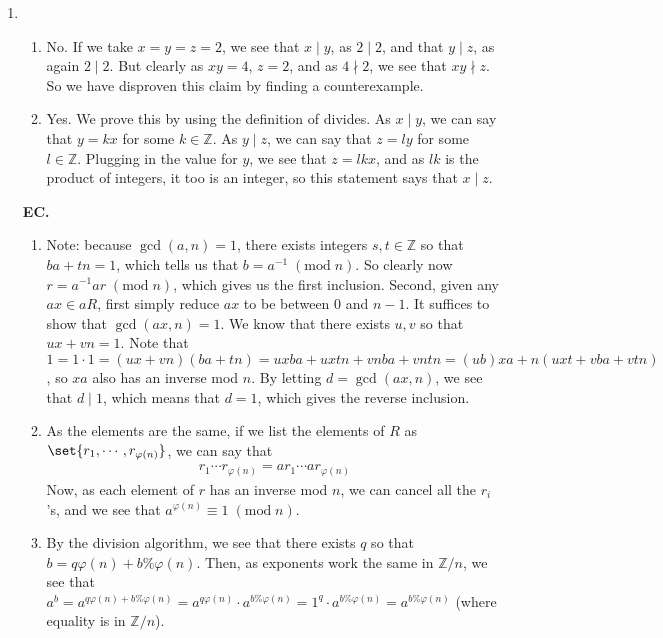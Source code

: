 \documentclass[12pt]{article}
\def\mbb#1{\mathbb{#1}}
\def\bZ{\mbb{Z}}
\theoremstyle{definition}
\theoremstyle{remark}
\renewcommand{\mod}[1]{\;(\mathrm{mod}\; #1)}
\begin{document}
\begin{enumerate}[leftmargin=\labelsep]
		\newpage
		\item 
		\begin{enumerate}
			\item 
			No. If we take $x = y = z = 2$, we see that $x \mid y$, as $2 \mid 2$, and that $y \mid z$, as again $2 \mid 2$. But clearly as $xy=4$, $z = 2$, and as $4 \nmid 2$, we see that $xy \nmid z$. So we have disproven this claim by finding a counterexample.
			\item Yes. We prove this by using the definition of divides. As $x \mid y$, we can say that $y = kx$ for some $k \in \bZ$. As $y \mid z$, we can say that $z = ly$ for some $l \in \bZ$. Plugging in the value for $y$, we see that $z = lkx$, and as $lk$ is the product of integers, it too is an integer, so this statement says that $x \mid z$.
		\end{enumerate}
	
		\newpage
		\item[\textbf{EC.}]
		\begin{enumerate}
			\item 
			Note: because $\gcd(a, n) = 1$, there exists integers $s, t \in \bZ$ so that $ba + tn = 1$, which tells us that $b = a^{-1} \mod{n}$. So clearly now $r = a^{-1}ar \mod{n}$, which gives us the first inclusion. Second, given any $ax \in aR$, first simply reduce $ax$ to be between $0$ and $n-1$. It suffices to show that $\gcd(ax, n) = 1$. We know that there exists $u, v$ so that $ux + vn = 1$. Note that $1 = 1 \cdot 1 = (ux+vn)(ba+tn) = uxba+uxtn+vnba+vntn = (ub)xa + n(uxt+vba+vtn)$, so $xa$ also has an inverse mod $n$. By letting $d = \gcd(ax, n)$, we see that $d \mid 1$, which means that $d = 1$, which gives the reverse inclusion.
			
			\item As the elements are the same, if we list the elements of $R$ as $\set{r_1, \cdots, r_{\varphi(n)}}$, we can say that
			\begin{align*}
				r_1 \cdots r_{\varphi(n)} = ar_1 \cdots a r_{\varphi(n)}
			\end{align*}
			Now, as each element of $r$ has an inverse mod $n$, we can cancel all the $r_i$'s, and we see that $a^{\varphi(n)} \equiv 1 \mod{n}$.
			
			\item By the division algorithm, we see that there exists $q$ so that $b = q\varphi(n) + b \% \varphi(n)$. Then, as exponents work the same in $\bZ/n$, we see that $a^b = a^{q\varphi(n)+b \% \varphi(n)} = a^{q\varphi(n)} \cdot a^{b \% \varphi(n)} = 1^q \cdot a^{b \% \varphi(n)} = a^{b \% \varphi(n)}$ (where equality is in $\bZ/n$).
			

\end{enumerate}
\end{enumerate}
\end{document}
